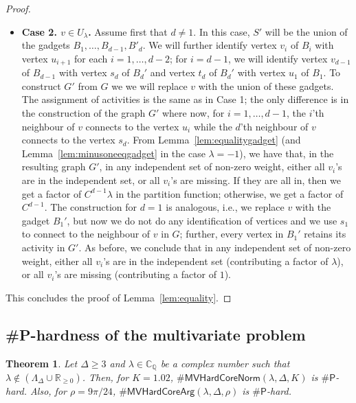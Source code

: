\documentclass[11pt]{article}
\newtheorem{theorem}{Theorem}
\def\numP{\#\mathsf{P}}
\def\Reals{\mathbb{R}}
\def\CQ{\mathbb{C}_{\mathbb{Q}}}
\def\LambdaD{\Lambda_\Delta}
\def\FactorMVHardCore#1{\#\ensuremath{\mathsf{MVHardCoreNorm}(\lambda,\Delta,#1)}}
\def\ArgMVHardCore#1{\#\ensuremath{\mathsf{MVHardCoreArg}(\lambda,\Delta,#1)}}
\begin{document}
\begin{proof}
\begin{itemize}
 \item {\bf Case 2. $v\in U_\lambda$.}\quad
 Assume first that $d\neq 1$. In this case, $S'$ will be the union of the gadgets
 $B_1,\ldots,B_{d-1},B'_{d}$. We will further identify vertex $v_i$ of $B_i$ with vertex $u_{i+1}$ for each $i=1,\hdots, d-2$; for $i=d-1$, we will identify vertex $v_{d-1}$  of $B_{d-1}$ with vertex $s_d$ of $B_d'$ and vertex $t_d$ of $B_d'$ with vertex $u_1$ of $B_1$.
To construct $G'$ from $G$ we  
we will replace $v$ with the union of
these gadgets.
The assignment of activities is the same as  in Case 1; the only difference is in the construction of the graph $G'$ where now, for $i=1,\hdots, d-1$, the $i$'th neighbour of $v$ connects to the vertex $u_i$ while the $d$'th neighbour of $v$ connects to the vertex $s_d$. From Lemma~\ref{lem:equalitygadget} (and Lemma~\ref{lem:minusoneeqgadget} in the case $\lambda=-1$), we have that, in the resulting graph $G'$, in any
independent set of non-zero weight, either  
all $v_i$'s are in the independent set, or all $v_i$'s are missing. 
If they are all in, then we get a factor of $C^{d-1}  \lambda$ in the partition function; otherwise, we get a factor of $C^{d-1} $. The construction for $d=1$ is analogous, i.e., we replace $v$ with the gadget $B_1'$, but now we do not do any identification of vertices and we use $s_1$ to connect to the neighbour of $v$ in $G$; further, every vertex in $B_1'$ retains its activity in $G'$. As before, we conclude that in any
independent set of non-zero weight, either  
all $v_i$'s are in the independent set (contributing a factor of $\lambda$), or all $v_i$'s are missing (contributing a factor of $1$). 
\end{itemize}
This concludes  the proof of Lemma~\ref{lem:equality}.
\end{proof}
  
  \subsection{\#P-hardness of the multivariate problem}    
  
   
\begin{theorem}\label{thm:MV}
Let $\Delta\geq 3$ and  
$\lambda\in \CQ$ be a complex number such that
$\lambda\not\in (\LambdaD \cup \Reals_{\geq 0})$.  Then, for $ K  =1.02$,
$\FactorMVHardCore{K}$ is $\numP$-hard. Also, for $\rho = 9\pi/24$, 
$\ArgMVHardCore{\rho}$ is $\numP$-hard.
\end{theorem}
\end{document}
